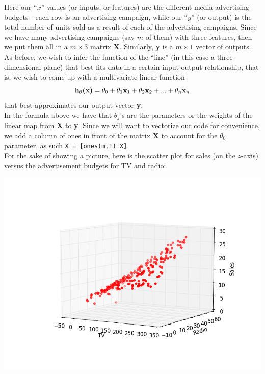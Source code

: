 \documentclass[11pt,a4paper,oneside]{report}
\begin{document}
Here our ``$x$'' values (or inputs, or features) are the different media advertising budgets - each row is an advertising campaign, while our ``$y$'' (or output) is the total number of units sold as a result of each of the advertising campaigns. Since we have many advertising campaigns (say $m$ of them) with three features, then we put them all in a $m \times 3$ matrix {\bf X}. Similarly, {\bf y} is a $m \times 1$ vector of outputs. As before, we wish to infer the function of the ``line'' (in this case a three-dimensional plane) that best fits data in a certain input-output relationship, that is, we wish to come up with a multivariate linear function
\[
\textnormal{{\bf h$_{\theta}$(x)}} = \theta_0 +
\theta_1 \textnormal{{\bf x}}_1 +
\theta_2 \textnormal{{\bf x}}_2 + ... +
\theta_n \textnormal{{\bf x}}_n
\]
 that best approximates our output vector {\bf y}.\\
 
In the formula above we have that $\theta_j$'s are the parameters or the weights of the linear map from {\bf X} to {\bf y}. Since we will want to vectorize our code for convenience, we add a column of ones in front of the matrix {\bf X} to account for the $\theta_0$ parameter, as such \verb+X = [ones(m,1) X]+.\\

For the sake of showing a picture, here is the scatter plot for sales (on the $z$-axis) versus the advertisement budgets for TV and radio:
\begin{center}
\includegraphics[scale=.5]{scatter3d.png}
\end{center}
\end{document}
